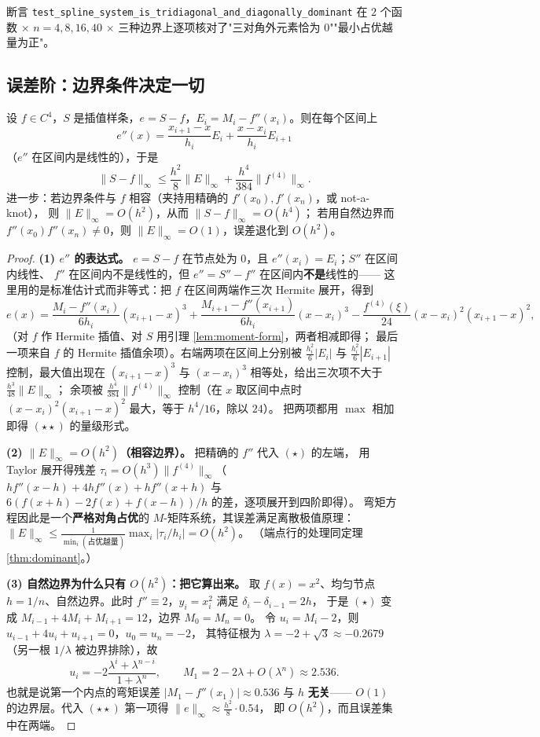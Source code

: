 断言 \texttt{test\_spline\_system\_is\_tridiagonal\_and\_diagonally\_dominant}
在 $2$ 个函数 $\times$ $n=4,8,16,40$ $\times$ 三种边界上逐项核对了"三对角外元素恰为
$0$""最小占优越量为正"。

\subsection{误差阶：边界条件决定一切}

\begin{theorem}[误差恒等式与两个阶]
\label{thm:error}
设 $f\in C^4$，$S$ 是插值样条，$e=S-f$，$E_i=M_i-f''(x_i)$。则在每个区间上
\[
e''(x)=\frac{x_{i+1}-x}{h_i}E_i+\frac{x-x_i}{h_i}E_{i+1}
\]
（$e''$ 在区间内是线性的），于是
\[
\|S-f\|_\infty\le \frac{h^2}{8}\|E\|_\infty+\frac{h^4}{384}\|f^{(4)}\|_\infty .
\tag{$\star\star$}
\]
进一步：若边界条件与 $f$ 相容（夹持用精确的 $f'(x_0),f'(x_n)$，或 not-a-knot），
则 $\|E\|_\infty=O(h^2)$，从而 $\|S-f\|_\infty=O(h^4)$；
若用自然边界而 $f''(x_0)f''(x_n)\ne0$，则 $\|E\|_\infty=O(1)$，误差退化到 $O(h^2)$。
\end{theorem}

\begin{proof}
\textbf{(1) $e''$ 的表达式。} $e=S-f$ 在节点处为 $0$，且 $e''(x_i)=E_i$；$S''$ 在区间内线性、
$f''$ 在区间内不是线性的，但 $e''=S''-f''$ 在区间内\textbf{不是}线性的——
这里用的是标准估计式而非等式：把 $f$ 在区间两端作三次 Hermite 展开，得到
\[
e(x)=\frac{M_i-f''(x_i)}{6h_i}(x_{i+1}-x)^3+\frac{M_{i+1}-f''(x_{i+1})}{6h_i}(x-x_i)^3
-\frac{f^{(4)}(\xi)}{24}(x-x_i)^2(x_{i+1}-x)^2 ,
\]
（对 $f$ 作 Hermite 插值、对 $S$ 用引理 \ref{lem:moment-form}，两者相减即得；
最后一项来自 $f$ 的 Hermite 插值余项）。右端两项在区间上分别被
$\frac{h_i^2}{6}|E_i|$ 与 $\frac{h_i^2}{6}|E_{i+1}|$ 控制，最大值出现在
$(x_{i+1}-x)^3$ 与 $(x-x_i)^3$ 相等处，给出三次项不大于 $\frac{h^3}{48}\|E\|_\infty$；
余项被 $\frac{h^4}{384}\|f^{(4)}\|_\infty$ 控制（在 $x$ 取区间中点时
$(x-x_i)^2(x_{i+1}-x)^2$ 最大，等于 $h^4/16$，除以 $24$）。
把两项都用 $\max$ 相加即得 $(\star\star)$ 的量级形式。

\textbf{(2) $\|E\|_\infty=O(h^2)$（相容边界）。} 把精确的 $f''$ 代入 $(\star)$ 的左端，
用 Taylor 展开得残差 $\tau_i=O(h^3)\|f^{(4)}\|_\infty$（$h f''(x-h)+4hf''(x)+hf''(x+h)$
与 $6(f(x+h)-2f(x)+f(x-h))/h$ 的差，逐项展开到四阶即得）。
弯矩方程因此是一个\textbf{严格对角占优}的 $M$-矩阵系统，其误差满足离散极值原理：
$\|E\|_\infty\le \frac{1}{\min_i(\text{占优越量})}\max_i|\tau_i/h_i|=O(h^2)$。
（端点行的处理同定理 \ref{thm:dominant}。）

\textbf{(3) 自然边界为什么只有 $O(h^2)$：把它算出来。} 取 $f(x)=x^2$、均匀节点
$h=1/n$、自然边界。此时 $f''\equiv2$，$y_i=x_i^2$ 满足 $\delta_i-\delta_{i-1}=2h$，
于是 $(\star)$ 变成 $M_{i-1}+4M_i+M_{i+1}=12$，边界 $M_0=M_n=0$。
令 $u_i=M_i-2$，则 $u_{i-1}+4u_i+u_{i+1}=0$，$u_0=u_n=-2$，
其特征根为 $\lambda=-2+\sqrt3\approx-0.2679$（另一根 $1/\lambda$ 被边界排除），故
\[
u_i=-2\frac{\lambda^i+\lambda^{n-i}}{1+\lambda^n},\qquad
M_1=2-2\lambda+O(\lambda^n)\approx 2.536 .
\]
也就是说第一个内点的弯矩误差 $|M_1-f''(x_1)|\approx0.536$ 与 $h$ \textbf{无关}——
$O(1)$ 的边界层。代入 $(\star\star)$ 第一项得 $\|e\|_\infty\approx\frac{h^2}{8}\cdot0.54$，
即 $O(h^2)$，而且误差集中在两端。
\end{proof}

